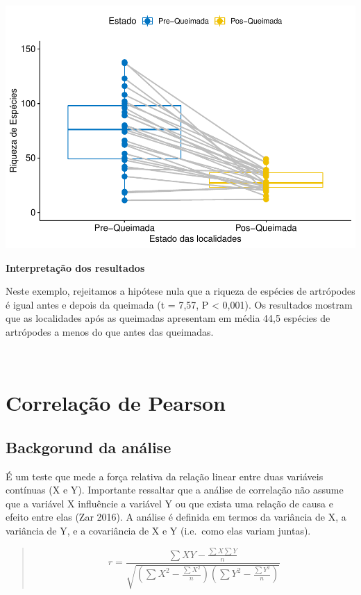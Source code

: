 \documentclass[
]{book}
\begin{document}
\includegraphics{livro_r_ecologia_files/figure-latex/unnamed-chunk-6-1.pdf}

\textbf{Interpretação dos resultados}

Neste exemplo, rejeitamos a hipótese nula que a riqueza de espécies de artrópodes é igual antes e depois da queimada (t = 7,57, P \textless{} 0,001). Os resultados mostram que as localidades após as queimadas apresentam em média 44,5 espécies de artrópodes a menos do que antes das queimadas.

~

\hypertarget{correlauxe7uxe3o-de-pearson}{%
\section{Correlação de Pearson}\label{correlauxe7uxe3o-de-pearson}}

\hypertarget{backgorund-da-anuxe1lise-2}{%
\subsection{Backgorund da análise}\label{backgorund-da-anuxe1lise-2}}

É um teste que mede a força relativa da relação linear entre duas variáveis contínuas (X e Y). Importante ressaltar que a análise de correlação não assume que a variável X influêncie a variável Y ou que exista uma relação de causa e efeito entre elas (Zar 2016). A análise é definida em termos da variância de X, a variância de Y, e a covariância de X e Y (i.e.~como elas variam juntas).

\begin{quote}
\[ r = \frac{\sum{XY} - \frac{\sum{X} \sum{Y}}{n}}{\sqrt{\left(\sum{X^2} - \frac{\sum{X}^2}{n}\right)\left(\sum{Y^2} - \frac{\sum{Y}^2}{n}\right)}} \]
\end{quote}
\end{document}
